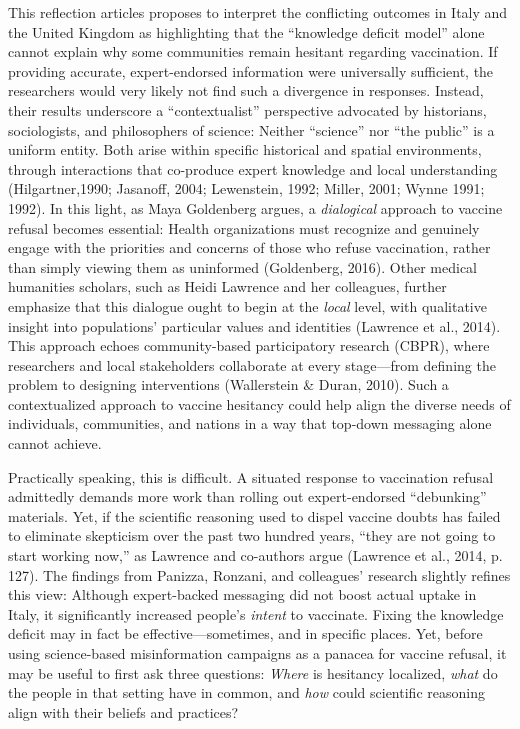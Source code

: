 \documentclass[authordate, reflection]{jote-new-article}
\begin{document}
	This reflection articles proposes to interpret the conflicting outcomes in Italy and the United Kingdom as highlighting that the “knowledge deficit model” alone cannot explain why some communities remain hesitant regarding vaccination. If providing accurate, expert-endorsed information were universally sufficient, the researchers would very likely not find such a divergence in responses. Instead, their results underscore a “contextualist” perspective advocated by historians, sociologists, and philosophers of science: Neither “science” nor “the public” is a uniform entity. Both arise within specific historical and spatial environments, through interactions that co-produce expert knowledge and local understanding (Hilgartner,1990; Jasanoff, 2004; Lewenstein, 1992; Miller, 2001; Wynne 1991; 1992). In this light, as Maya Goldenberg argues, a \emph{dialogical} approach to vaccine refusal becomes essential: Health organizations must recognize and genuinely engage with the priorities and concerns of those who refuse vaccination, rather than simply viewing them as uninformed (Goldenberg, 2016). Other medical humanities scholars, such as Heidi Lawrence and her colleagues, further emphasize that this dialogue ought to begin at the \emph{local} level, with qualitative insight into populations' particular values and identities (Lawrence et al., 2014). This approach echoes community-based participatory research (CBPR), where researchers and local stakeholders collaborate at every stage—from defining the problem to designing interventions (Wallerstein \& Duran, 2010). Such a contextualized approach to vaccine hesitancy could help align the diverse needs of individuals, communities, and nations in a way that top-down messaging alone cannot achieve.







	Practically speaking, this is difficult. A situated response to vaccination refusal admittedly demands more work than rolling out expert-endorsed “debunking” materials. Yet, if the scientific reasoning used to dispel vaccine doubts has failed to eliminate skepticism over the past two hundred years, “they are not going to start working now,” as Lawrence and co-authors argue (Lawrence et al., 2014, p. 127). The findings from Panizza, Ronzani, and colleagues' research slightly refines this view: Although expert-backed messaging did not boost actual uptake in Italy, it significantly increased people's \emph{intent} to vaccinate. Fixing the knowledge deficit may in fact be effective—sometimes, and in specific places. Yet, before using science-based misinformation campaigns as a panacea for vaccine refusal, it may be useful to first ask three questions: \emph{Where} is hesitancy localized, \emph{what} do the people in that setting have in common, and \emph{how} could scientific reasoning align with their beliefs and practices?
\end{document}
